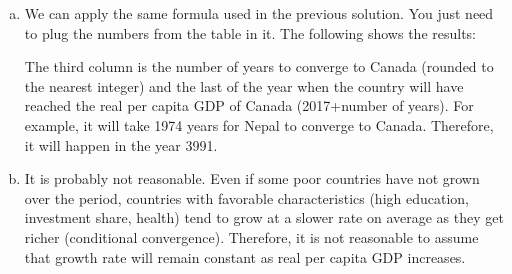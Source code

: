 \documentclass[letterpaper]{article}\usepackage[]{graphicx}\usepackage[]{color}
\numberwithin{exer}{section}
\theoremstyle{nonumberplain}
\begin{document}
\begin{enumerate}[a)]
country B.
\item We can apply the same formula used in the previous solution. You
  just need to plug the numbers from the table in it. The following shows the results:
\begin{center}
\end{center}  
The third column is the number of years to converge to Canada (rounded
to the nearest integer) and the last of the year when the country will
have reached the real per capita GDP of Canada (2017+number of
years). For example, it will take 1974 years for
Nepal to converge to Canada. Therefore, it will
happen in the year 3991. 
\item It is probably not reasonable. Even if some poor countries have
  not grown over the period, countries with favorable characteristics
  (high education, investment share, health) tend to grow at a slower
  rate on average as they get richer (conditional
  convergence). Therefore, it is not reasonable to assume that growth
  rate will remain constant as real per capita GDP increases.

\end{enumerate}


\end{document}
